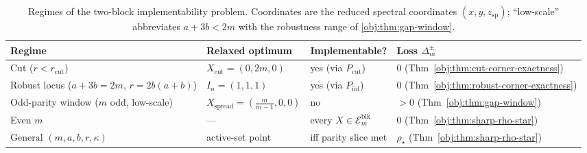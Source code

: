 \begin{table}[h]
\centering
\begin{tabular}{llll}
\textbf{Regime} & \textbf{Relaxed optimum} & \textbf{Implementable?} & \textbf{Loss $\Delta_m^{\pm}$} \\
\hline
Cut ($r<r_{\mathrm{cut}}$) & $X_{\mathrm{cut}}=(0,2m,0)$ & yes (via $P_{\mathrm{cut}}$) & $0$ (Thm~\cref{obj:thm:cut-corner-exactness}) \\
Robust locus ($a+3b=2m$, $r=2b(a+b)$) & $I_n=(1,1,1)$ & yes (via $P_{\mathrm{iid}}$) & $0$ (Thm~\cref{obj:thm:robust-corner-exactness}) \\
Odd-parity window ($m$ odd, low-scale) & $X_{\mathrm{spread}}=(\tfrac{m}{m-1},0,0)$ & no & $>0$ (Thm~\cref{obj:thm:gap-window}) \\
Even $m$ & --- & every $X\in\mathcal E_m^{\mathrm{blk}}$ & $0$ (Thm~\cref{obj:thm:sharp-rho-star}) \\
General $(m,a,b,r,\kappa)$ & active-set point & iff parity slice met & $\rho_\star$ (Thm~\cref{obj:thm:sharp-rho-star}) \\
\end{tabular}
\caption{Regimes of the two-block implementability problem. Coordinates are the reduced spectral coordinates $(x,y,z_{\mathrm{sp}})$; ``low-scale'' abbreviates $a+3b<2m$ with the robustness range of \cref{obj:thm:gap-window}.}
\label{tab:regimes}
\end{table}
